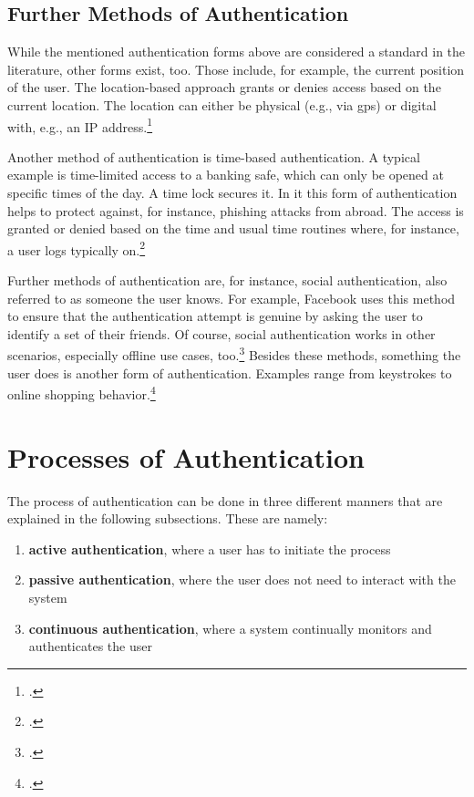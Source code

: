 \subsection{Further Methods of Authentication}

While the mentioned authentication forms above are considered a standard in the literature, other forms exist, too. Those include, for example, the current position of the user. The location-based approach grants or denies access based on the current location. The location can either be physical (e.g., via \gls{gps}) or digital with, e.g., an IP address.\footcites[See][]{6296127}[See][Chapter 13.9]{2308830}

Another method of authentication is time-based authentication. A typical example is time-limited access to a banking safe, which can only be opened at specific times of the day. A time lock secures it. In \gls{it} this form of authentication helps to protect against, for instance, phishing attacks from abroad. The access is granted or denied based on the time and usual time routines where, for instance, a user logs typically on.\footcite[See][191]{dasgupta2017multi}

Further methods of authentication are, for instance, social authentication, also referred to as \frqq someone the user knows\flqq. For example, Facebook uses this method to ensure that the authentication attempt is genuine by asking the user to identify a set of their friends. Of course, social authentication works in other scenarios, especially offline use cases, too.\footcites[See][]{Brainard2006}[See][278--279]{shostack2014threat} Besides these methods, \frqq something the user does\flqq{} is another form of authentication. Examples range from keystrokes to online shopping behavior.\footcites[See][]{10.1007/978-3-642-18178-8_9}[See][]{7460349}

\section{Processes of Authentication}

The process of authentication can be done in three different manners that are explained in the following subsections. These are namely:

\begin{enumerate}
	\item \textbf{active authentication}, where a user has to initiate the process
	\item \textbf{passive authentication}, where the user does not need to interact with the system
	\item \textbf{continuous authentication}, where a system continually monitors and authenticates the user
\end{enumerate}

